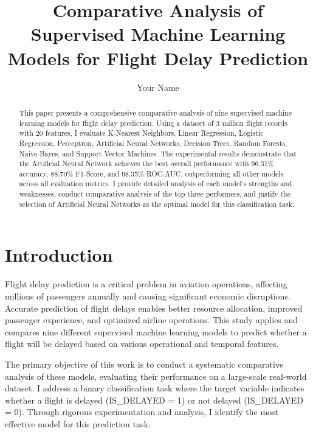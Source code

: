 \documentclass[sigconf]{acmart}
\begin{document}
\title{Comparative Analysis of Supervised Machine Learning Models for Flight Delay Prediction}

\author{Your Name}

\begin{abstract}
This paper presents a comprehensive comparative analysis of nine supervised machine learning models for flight delay prediction. Using a dataset of 3 million flight records with 20 features, I evaluate K-Nearest Neighbors, Linear Regression, Logistic Regression, Perceptron, Artificial Neural Networks, Decision Trees, Random Forests, Naive Bayes, and Support Vector Machines. The experimental results demonstrate that the Artificial Neural Network achieves the best overall performance with 96.31\% accuracy, 88.70\% F1-Score, and 98.35\% ROC-AUC, outperforming all other models across all evaluation metrics. I provide detailed analysis of each model's strengths and weaknesses, conduct comparative analysis of the top three performers, and justify the selection of Artificial Neural Networks as the optimal model for this classification task.
\end{abstract}

\maketitle

\section{Introduction}

Flight delay prediction is a critical problem in aviation operations, affecting millions of passengers annually and causing significant economic disruptions. Accurate prediction of flight delays enables better resource allocation, improved passenger experience, and optimized airline operations. This study applies and compares nine different supervised machine learning models to predict whether a flight will be delayed based on various operational and temporal features.

The primary objective of this work is to conduct a systematic comparative analysis of these models, evaluating their performance on a large-scale real-world dataset. I address a binary classification task where the target variable indicates whether a flight is delayed (IS\_DELAYED = 1) or not delayed (IS\_DELAYED = 0). Through rigorous experimentation and analysis, I identify the most effective model for this prediction task.
\end{document}
